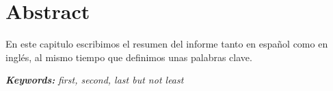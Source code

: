 %
%

\chapter*{Abstract}

\noindent
En este capitulo escribimos el resumen del informe tanto en español como en inglés, al mismo tiempo que definimos unas palabras clave.

\blindtext

\vspace{2cm}
\noindent
\textbf{\textit{Keywords:}} {\textit{first, second, last but not least}}

\clearpage